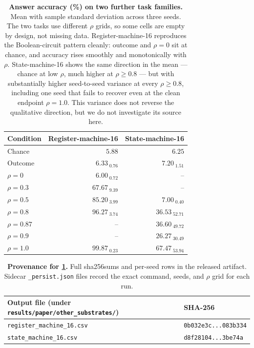 \begin{table}[htbp]
\centering
\small
\begin{tabular}{lrr}
\toprule
Condition & Register-machine-16 & State-machine-16 \\
\midrule
Chance & $5.88$ & $6.25$ \\
Outcome & $6.33_{\;0.76}$ & $7.20_{\;1.51}$ \\
$\rho=0$ & $6.00_{\;0.72}$ & -- \\
$\rho=0.3$ & $67.67_{\;9.39}$ & -- \\
$\rho=0.5$ & $85.20_{\;3.99}$ & $7.00_{\;0.40}$ \\
$\rho=0.8$ & $96.27_{\;3.74}$ & $36.53_{\;52.71}$ \\
$\rho=0.87$ & -- & $36.60_{\;49.72}$ \\
$\rho=0.9$ & -- & $26.27_{\;30.49}$ \\
$\rho=1.0$ & $99.87_{\;0.23}$ & $67.47_{\;53.94}$ \\
\bottomrule
\end{tabular}
\caption{\textbf{Answer accuracy (\%) on two further task families.} Mean
with sample standard deviation across three seeds. The two tasks use
different $\rho$ grids, so some cells are empty by design, not missing
data. Register-machine-16 reproduces the
Boolean-circuit pattern cleanly: outcome and $\rho{=}0$ sit at chance,
and accuracy rises smoothly and monotonically with $\rho$. State-machine-16
shows the same direction in the mean --- chance at low $\rho$, much higher
at $\rho\ge0.8$ --- but with substantially higher seed-to-seed variance at
every $\rho\ge0.8$, including one seed that fails to recover even at the
clean endpoint $\rho{=}1.0$. This variance does not reverse the qualitative
direction, but we do not investigate its source here.}
\label{tab:other-substrates}
\end{table}

\begin{table}[htbp]
\centering
\footnotesize
\begin{tabular}{ll}
\toprule
Output file (under \texttt{results/paper/other\_substrates/}) & SHA-256 \\
\midrule
\texttt{register\_machine\_16.csv} & \texttt{0b032e3c...083b334} \\
\texttt{state\_machine\_16.csv} & \texttt{d8f28104...3be74a} \\
\bottomrule
\end{tabular}
\caption{\textbf{Provenance for \cref{tab:other-substrates}.} Full
sha256sums and per-seed rows in the released artifact. Sidecar
\texttt{\_persist.json} files record the exact command, seeds, and
$\rho$ grid for each run.}
\label{tab:other-substrates-provenance}
\end{table}


